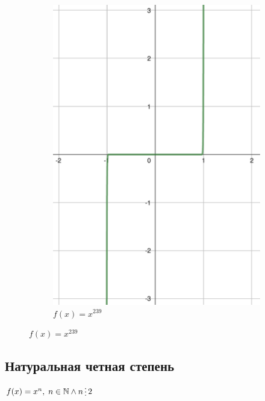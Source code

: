\begin{figure}[h]
\begin{subfigure}{0.35\textwidth}
        \includegraphics[width=\textwidth]{tex/chapter_2/assets/y=x^239.pdf}
        \caption*{$f(x) = x^{239}$}
    \end{subfigure}
\end{figure}


\subsection{Натуральная четная степень}

$f(x) = x^n, \; n \in \mathbb{N}  \land n \divisible 2$

